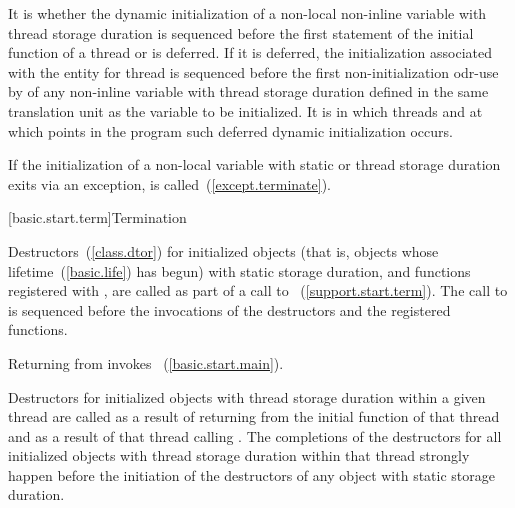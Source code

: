 \pnum
It is 
whether the dynamic initialization of a
non-local non-inline variable with thread storage duration
is sequenced before the first statement of the initial function of a thread or is deferred.
If it is deferred,
the initialization associated with the entity for thread 
is sequenced before the first non-initialization odr-use by 
of any non-inline variable with thread storage duration
defined in the same translation unit as the variable to be initialized.
It is 
in which threads and at which points in the program such deferred dynamic initialization occurs.

\pnum
If the initialization of a non-local variable with static or thread storage duration
exits via
an exception,  is called~(\ref{except.terminate}).%

[basic.start.term]{Termination}

\pnum
{}%
%
%
Destructors~(\ref{class.dtor}) for initialized objects
(that is, objects whose lifetime~(\ref{basic.life}) has begun)
with static storage duration,
and functions registered with ,
are called as part of a call to
%
%
~(\ref{support.start.term}).
The call to  is sequenced before
the invocations of the destructors and the registered functions.
\begin{note}
Returning from  invokes ~(\ref{basic.start.main}).
\end{note}

\pnum
Destructors for initialized objects with thread storage duration within a given thread
are called as a result of returning from the initial function of that thread and as a
result of that thread calling .
The completions of the destructors for all initialized objects with thread storage
duration within that thread strongly happen before the initiation of the destructors of
any object with static storage duration.

